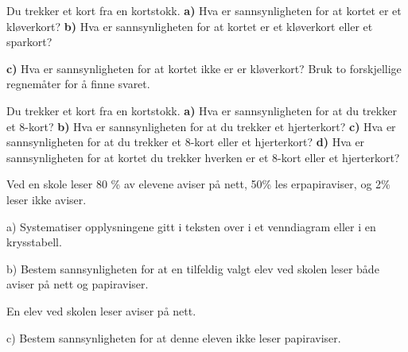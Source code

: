 




\opgt

\nes 

Du trekker et kort fra en kortstokk.\os
\textbf{a)} Hva er sannsynligheten for at kortet er et kløverkort?\os
\textbf{b)} Hva er sannsynligheten for at kortet er et kløverkort eller et sparkort?\os

\textbf{c)} Hva er sannsynligheten for at kortet ikke er er kløverkort? Bruk to forskjellige regnemåter for å finne svaret.

Du trekker et kort fra en kortstokk.\os
\textbf{a)} Hva er sannsynligheten for at du trekker et 8-kort?\os
\textbf{b)} Hva er sannsynligheten for at du trekker et hjerterkort?\os
\textbf{c)} Hva er sannsynligheten for at du trekker et 8-kort eller et hjerterkort?\os
\textbf{d)} Hva er sannsynligheten for at kortet du trekker hverken er et 8-kort eller et hjerterkort?


Ved en skole leser 80 \% av elevene aviser på nett, 50\% les erpapiraviser, og 2\% leser ikke
aviser. \os

a) Systematiser opplysningene gitt i teksten over i et venndiagram eller i en
krysstabell. \os

b) Bestem sannsynligheten for at en tilfeldig valgt elev ved skolen leser både aviser på nett og papiraviser.\os

En elev ved skolen leser aviser på nett.\os

c) Bestem sannsynligheten for at denne eleven ikke leser papiraviser.




